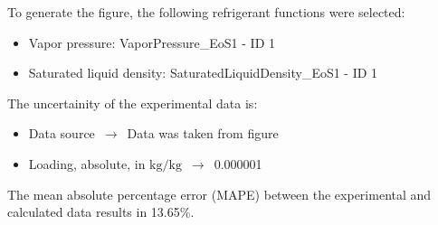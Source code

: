 To generate the figure, the following refrigerant functions were selected:
\begin{itemize}
\item Vapor pressure: VaporPressure\_EoS1 - ID 1
\item Saturated liquid density: SaturatedLiquidDensity\_EoS1 - ID 1
\end{itemize}

The uncertainity of the experimental data is:
\begin{itemize}
\item Data source $\,\to\,$ Data was taken from figure
\item Loading, absolute, in $\si{\kilogram\per\kilogram}$ $\,\to\,$ 0.000001
\end{itemize}

The mean absolute percentage error (MAPE) between the experimental and calculated data results in 13.65\%.
\FloatBarrier
\newpage
